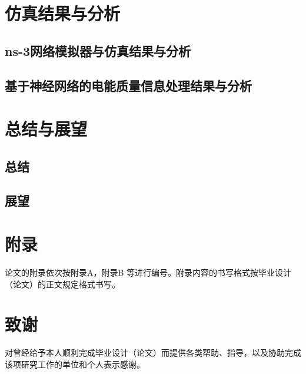 \documentclass[UTF8，a4paper]{ctexrep}
\begin{document}
\chapter{仿真结果与分析}{\heiti{}}
\thispagestyle{fancy}
\section{ns-3网络模拟器与仿真结果与分析}
\section{基于神经网络的电能质量信息处理结果与分析}
\chapter{总结与展望}{\heiti{}}
\thispagestyle{fancy}
\section{总结}
\section{展望}
\clearpage

\thispagestyle{fancy}
\chapter*{附\qquad 录}{\heiti{}}
\thispagestyle{fancy}
论文的附录依次按附录A，附录B 等进行编号。附录内容的书写格式按毕业设计（论文）的正文规定格式书写。
\chapter*{致\qquad 谢}{\heiti{}}
\thispagestyle{fancy}
对曾经给予本人顺利完成毕业设计（论文）而提供各类帮助、指导，以及协助完成该项研究工作的单位和个人表示感谢。
\end{document}
